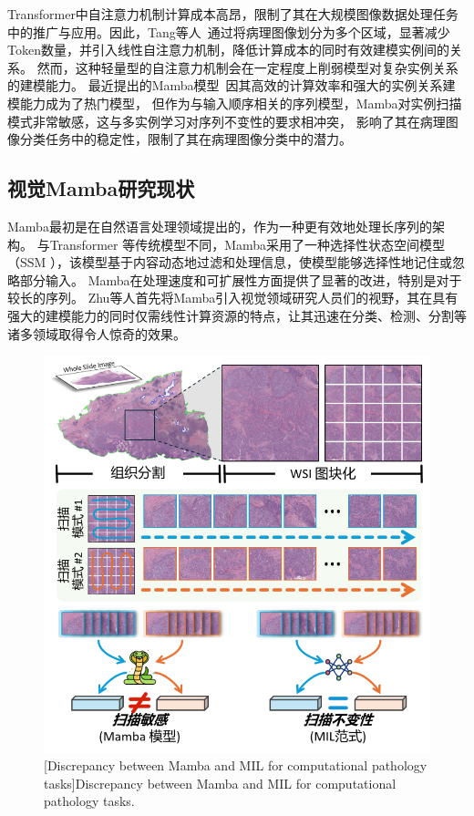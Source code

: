 Transformer中自注意力机制计算成本高昂，限制了其在大规模图像数据处理任务中的推广与应用。因此，Tang等人~\cite{tang2024feature}通过将病理图像划分为多个区域，显著减少Token数量，并引入线性自注意力机制，降低计算成本的同时有效建模实例间的关系。
然而，这种轻量型的自注意力机制会在一定程度上削弱模型对复杂实例关系的建模能力。
最近提出的Mamba模型~\cite{gu2023mamba}因其高效的计算效率和强大的实例关系建模能力成为了热门模型，
但作为与输入顺序相关的序列模型，Mamba对实例扫描模式非常敏感，这与多实例学习对序列不变性的要求相冲突，
影响了其在病理图像分类任务中的稳定性，限制了其在病理图像分类中的潜力。


\subsection[\hspace{-2pt}视觉Mamba研究现状]{{\heiti{} \hspace{-8pt}视觉Mamba研究现状}}\label{section1: 视觉Mamba研究现状}

Mamba最初是在自然语言处理领域提出的，作为一种更有效地处理长序列的架构\cite{gu2023mamba}。
与Transformer \cite{vaswani2017attention}等传统模型不同，Mamba采用了一种选择性状态空间模型（SSM \cite{kalman1960new}），该模型基于内容动态地过滤和处理信息，使模型能够选择性地记住或忽略部分输入。
Mamba在处理速度和可扩展性方面提供了显著的改进，特别是对于较长的序列。
Zhu等人首先将Mamba引入视觉领域研究人员们的视野\cite{zhu2024vision}，其在具有强大的建模能力的同时仅需线性计算资源的特点，让其迅速在分类、检测、分割等诸多领域取得令人惊奇的效果。
\begin{figure}[h]
    \centering
    \includegraphics[width=0.7\columnwidth]{figures/Discrepancy1.png}
    [Discrepancy between Mamba and MIL for computational pathology tasks]{Discrepancy between Mamba and MIL for computational pathology tasks.}
    \label{figure1: Mamba模型与MIL任务差异}
\end{figure}

